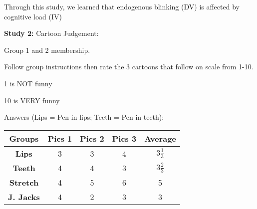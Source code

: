 \begin{enumerate}
\begin{coloredlist}
\begin{coloredlist}
\begin{coloredlist}
            \end{coloredlist}
        \end{coloredlist} 
        \item Through this study, we learned that endogenous blinking (DV) is affected by cognitive load (IV)
    \end{coloredlist}
    \item \textbf{Study 2:} Cartoon Judgement:
    \begin{coloredlist}
        \item Group 1 and 2 membership.
        \item Follow group instructions then rate the 3 cartoons that follow on scale from 1-10.
        \begin{coloredlist}
            \item 1 is NOT funny
            \item 10 is VERY funny
            \item Answers (Lips = Pen in lips; Teeth = Pen in teeth):

            \begin{tabular}[htbp]{ccccc}
                \toprule
                \textbf{Groups} & \textbf{Pics 1} & \textbf{Pics 2} & \textbf{Pics 3} & \textbf{Average} \\ \midrule
                \textbf{Lips} & 3 & 3 & 4 & \(3\frac{1}{3}\) \\ \midrule
                \textbf{Teeth} & 4 & 4 & 3 & \(3\frac{2}{3}\) \\ \midrule
                \textbf{Stretch} & 4 & 5 & 6 & 5 \\ \midrule
                \textbf{J. Jacks} & 4 & 2 & 3 & 3 \\ \bottomrule
            \end{tabular}


\end{coloredlist}
\end{coloredlist}
\end{enumerate}
